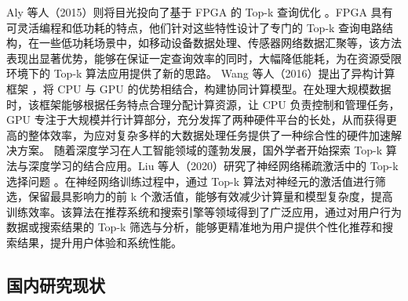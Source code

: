 Aly 等人（2015）则将目光投向了基于 FPGA 的 Top-k 查询优化 \cite {aly2015accelerating}。FPGA 具有可灵活编程和低功耗的特点，他们针对这些特性设计了专门的 Top-k 查询电路结构，在一些低功耗场景中，如移动设备数据处理、传感器网络数据汇聚等，该方法表现出显著优势，能够在保证一定查询效率的同时，大幅降低能耗，为在资源受限环境下的 Top-k 算法应用提供了新的思路。
Wang 等人（2016）提出了异构计算框架 \cite {wang2016hybrid}，将 CPU 与 GPU 的优势相结合，构建协同计算模型。在处理大规模数据时，该框架能够根据任务特点合理分配计算资源，让 CPU 负责控制和管理任务，GPU 专注于大规模并行计算部分，充分发挥了两种硬件平台的长处，从而获得更高的整体效率，为应对复杂多样的大数据处理任务提供了一种综合性的硬件加速解决方案。
随着深度学习在人工智能领域的蓬勃发展，国外学者开始探索 Top-k 算法与深度学习的结合应用。Liu 等人（2020）研究了神经网络稀疏激活中的 Top-k 选择问题 \cite {liu2020deep}。在神经网络训练过程中，通过 Top-k 算法对神经元的激活值进行筛选，保留最具影响力的前 k 个激活值，能够有效减少计算量和模型复杂度，提高训练效率。该算法在推荐系统和搜索引擎等领域得到了广泛应用，通过对用户行为数据或搜索结果的 Top-k 筛选与分析，能够更精准地为用户提供个性化推荐和搜索结果，提升用户体验和系统性能。




\subsection{国内研究现状}



